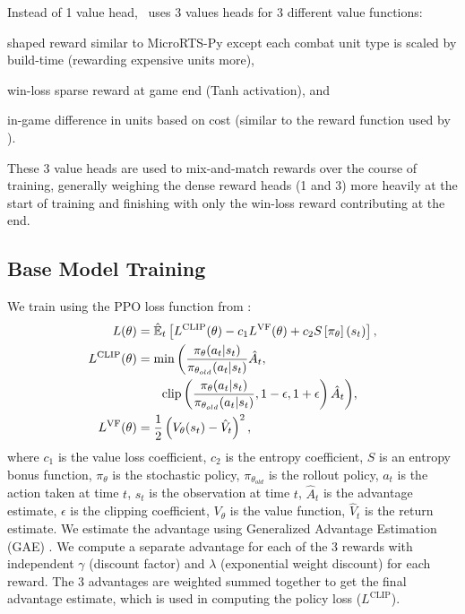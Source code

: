 \documentclass[conference]{IEEEtran}
\begin{document}
Instead of 1 value head, \agentName\ uses 3 values heads for 3 different value
functions:
\begin{inparaenum}[(1)]
    \item shaped reward similar to MicroRTS-Py except each combat unit type is
    scaled by build-time (rewarding expensive units more),
    \item win-loss sparse reward at game end (Tanh activation), and
    \item in-game difference in units based on cost (similar to the reward function used
    by \cite{Winter2021}).
\end{inparaenum}
These 3 value heads are used to mix-and-match rewards over the course of training,
generally weighing the dense reward heads (1 and 3) more heavily at the start of
training and finishing with only the win-loss reward contributing at the end.

\subsection{Base Model Training}
We train using the PPO loss function from \cite{DBLP:journals/corr/SchulmanWDRK17}:
\begin{align}
    L(\theta) &= \hat{\mathbb{E}}_t \left[ L^{\text{CLIP}}(\theta) - c_1 L^{\text{VF}}(\theta) + c_2 S\left[\pi_\theta\right](s_t) \right], \\
    L^{\text{CLIP}}(\theta) &= \min \bigg( \frac{\pi_\theta(a_t|s_t)}{\pi_{\theta_{old}}(a_t|s_t)} \hat{A}_t, \notag \\
    &\qquad \text{clip}\left( \frac{\pi_\theta(a_t|s_t)}{\pi_{\theta_{old}}(a_t|s_t)}, 1-\epsilon, 1+\epsilon \right) \hat{A}_t \bigg), \\
    L^{\text{VF}}(\theta) &= \frac{1}{2} \left( V_\theta(s_t) - \hat{V}_t \right)^2,
\end{align}
where $c_1$ is the value loss coefficient, $c_2$ is the entropy coefficient, $S$ is an
entropy bonus function, $\pi_\theta$ is the stochastic policy, $\pi_{\theta_{old}}$ is the rollout policy, $a_t$
is the action taken at time $t$, $s_t$ is the observation at time $t$, $\hat{A}_t$
is the advantage estimate,  $\epsilon$ is the clipping coefficient, $V_\theta$ is the
value function, $\hat{V}_t$ is the return estimate. We estimate the advantage
using Generalized Advantage Estimation (GAE) \cite{DBLP:journals/corr/SchulmanMLJA15}.
We compute a separate advantage for each of the 3 rewards with independent $\gamma$
(discount factor) and $\lambda$ (exponential weight discount) for each reward. The 3 
advantages are weighted summed together to get the final advantage estimate, which is
used in computing the policy loss ($L^{\text{CLIP}}$).
\end{document}
